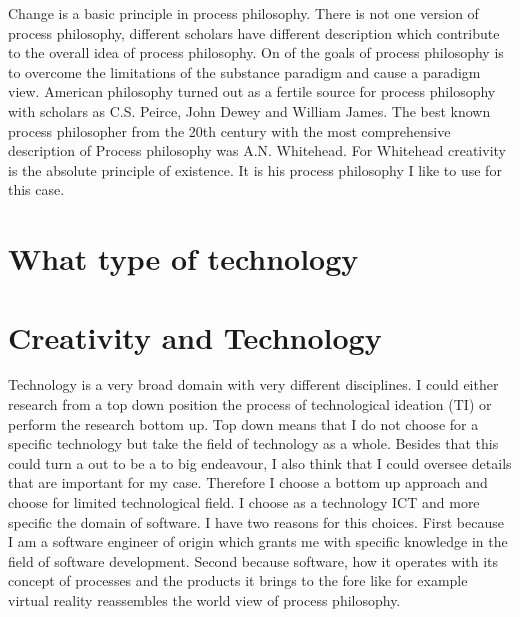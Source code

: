 Change is a basic principle in process philosophy. There is not one version of process philosophy, different scholars have different description which contribute to the overall idea of process philosophy.
On of the goals of process philosophy is to overcome the limitations of the substance paradigm and cause a paradigm view.
American philosophy turned out as a fertile source for process philosophy with scholars as C.S. Peirce, John Dewey and William James. The best known process philosopher from the 20th century with the most comprehensive description of Process philosophy was A.N. Whitehead. For Whitehead creativity is the absolute principle of existence. It is his process philosophy I like to use for this case.



\section{What type of technology}
\section{Creativity and Technology}
Technology is a very broad domain with very different disciplines. 
I could either research from a top down position the process of technological ideation (TI) or perform the research bottom up.
Top down means that I do not choose for a specific technology but take the field of technology as a whole. Besides that this could turn a out to be a to big endeavour, I also think that I could oversee details that are important for my case. Therefore I choose a bottom up  approach and choose for limited technological field.
I choose as a technology ICT and more specific the domain of software. I have two reasons for this choices. First because I am a software engineer of origin which grants me with specific knowledge in the field of software development. Second because software, how it operates with its concept of processes and the products it brings to the fore like for example virtual reality reassembles the world view of process philosophy.


